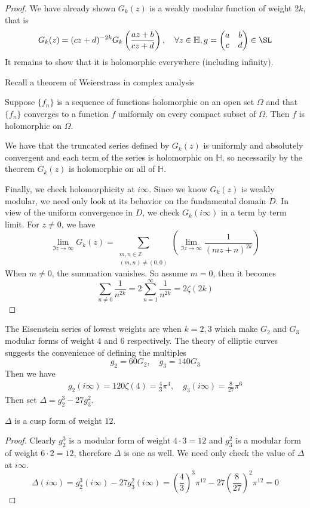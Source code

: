 \documentclass[12pt]{article}
\theoremstyle{definition}
\begin{document}
\begin{proof}
We have already shown \(G_k(z)\) is a weakly modular function of weight \(2k\), that is
\[
    G_k(z) = (cz+d)^{-2k}G_k\left(\frac{az+b}{cz+d}\right), \quad \forall z\in \mathbb{H}, g = \begin{pmatrix}
        a &  b \\
        c &  d \\
    \end{pmatrix} \in \SL
\] 
It remains to show that it is holomorphic everywhere (including infinity).

Recall a theorem of Weierstrass in complex analysis
\begin{thm}
Suppose \(\{ f_n \} \) is a sequence of functions holomorphic on an open set \(\Omega \) and that \(\{ f_n \} \) converges to a function \(f\) uniformly on every compact subset of \(\Omega \). Then \(f\) is holomorphic on \(\Omega \).      
\end{thm}
We have that the truncated series defined by \(G_k(z)\) is uniformly and absolutely convergent and each term of the series is holomorphic on \(\mathbb{H} \), so necessarily by the theorem \(G_k(z)\) is holomorphic on all of \(\mathbb{H} \).

Finally, we check holomorphicity at \(i\infty \). Since we know \(G_k(z)\) is weakly modular, we need only look at its behavior on the fundamental domain \(D\). In view of the uniform convergence in \(D\), we check \(G_k(i\infty )\) in a term by term limit. For \(z\ne 0\), we have  
\[
    \lim_{\Im z \to \infty }G_k(z) = \sum_{\substack{m,n\in \mathbb{Z}\\(m,n)\ne (0,0)}} \left(\lim_{\Im z \to \infty } \frac{1}{(mz+n)^{2k} }\right) 
\]    
When \(m \ne 0\), the summation vanishes. So assume \(m = 0\), then it becomes
\[
    \sum_{n\ne 0} \frac{1}{n^{2k} } = 2 \sum_{n=1}^{\infty} \frac{1}{n^{2k} } = 2 \zeta (2k)  
\] 
\end{proof}

The Eisenstein series of lowest weights are when \(k=2,3\) which make \(G_2\) and \(G_3\) modular forms of weight \(4\) and \(6\) respectively. The theory of elliptic curves suggests the convenience of defining the multiples
\[
    g_2=60G_2, \quad g_3 =140G_3
\]
Then we have
\begin{align*}
g_2(i\infty ) = 120\zeta(4) = \frac{4}{3}\pi ^4, \quad g_3(i\infty ) = \frac{8}{27}\pi ^6
\end{align*} 
Then set \(\Delta =g_2^3 - 27g_3^2\).
\begin{claim}
    \(\Delta \) is a cusp form of weight \(12\).  
\end{claim}
\begin{proof}
Clearly \(g_2^3\) is a modular form of weight \(4\cdot 3=12\) and \(g_3^2\) is a modular form of weight \(6\cdot 2=12\), therefore \(\Delta \) is one as well. We need only check the value of \(\Delta \) at \(i\infty \).
\[
    \Delta (i\infty ) =g_2^3(i\infty ) - 27 g_3^2(i\infty ) = \left( \frac{4}{3} \right)^3 \pi^{12} - 27 \left( \frac{8}{27} \right)^2 \pi ^{12} =0
    \]       
\end{proof}
\end{document}
